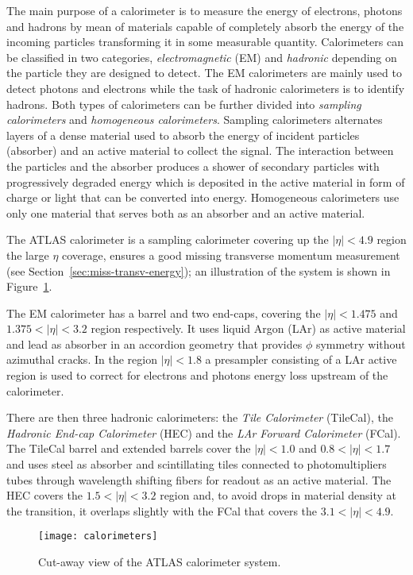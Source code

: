 The main purpose of a calorimeter is to measure the energy of electrons, photons
and hadrons by mean of materials capable of completely absorb the energy of the
incoming particles transforming it in some measurable quantity. Calorimeters can
be classified in two categories, \emph{electromagnetic} (EM) and \emph{hadronic}
depending on the particle they are designed to detect. The EM calorimeters are
mainly used to detect photons and electrons while the task of hadronic
calorimeters is to identify hadrons. Both types of calorimeters can be further
divided into \emph{sampling calorimeters} and \emph{homogeneous
  calorimeters}. Sampling calorimeters alternates layers of a dense material
used to absorb the energy of incident particles (absorber) and an active
material to collect the signal. The interaction between the particles and the
absorber produces a shower of secondary particles with progressively degraded
energy which is deposited in the active material in form of charge or light that
can be converted into energy. Homogeneous calorimeters use only one material
that serves both as an absorber and an active material\cite{Calorimetry}.

The ATLAS calorimeter is a sampling calorimeter covering up the $|\eta| < 4.9$
region the large $\eta$ coverage, ensures a good missing transverse momentum
measurement (see Section~\ref{sec:miss-transv-energy}); an illustration of the
system is shown in Figure~\ref{fig:calo}.

The EM calorimeter has a barrel and two end-caps, covering the $|\eta| < 1.475$
and $1.375 < |\eta| < 3.2$ region respectively. It uses liquid Argon (LAr) as
active material and lead as absorber in an accordion geometry that provides
$\phi$ symmetry without azimuthal cracks. In the region $|\eta| < 1.8$ a
presampler consisting of a LAr active region is used to correct for electrons
and photons energy loss upstream of the calorimeter.

There are then three hadronic calorimeters: the \emph{Tile Calorimeter}
(TileCal), the \emph{Hadronic End-cap Calorimeter} (HEC) and the \emph{LAr
  Forward Calorimeter} (FCal). The TileCal barrel and extended barrels cover the
$|\eta| < 1.0$ and $0.8 < |\eta| < 1.7$ and uses steel as absorber and
scintillating tiles connected to photomultipliers tubes through wavelength
shifting fibers for readout as an active material. The HEC covers the
$1.5 < |\eta| < 3.2$ region and, to avoid drops in material density at the
transition, it overlaps slightly with the FCal that covers the
$3.1 < |\eta| < 4.9$.

\begin{figure}[!h]
  \centering
    \texttt{[image: calorimeters]}
    \caption{Cut-away view of the ATLAS calorimeter system.}
    \label{fig:calo}
\end{figure}
